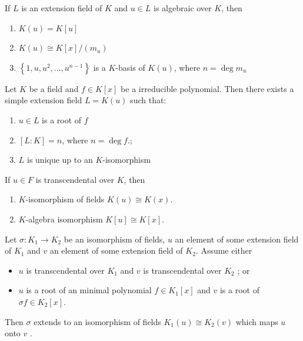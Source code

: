 \begin{theorem}
    \label{thm: Structure of simple extension}
    If $L$ is an extension field of $K$ and $ u  \in {L}$ is algebraic over $K$, then
    \begin{enumerate}
        \item
              $K(u)= K [u]$

        \item
              $K(u) \cong K [x]/( m_u )$
        \item
              $\left\{1,u ,u^2, \ldots,u^{{n}-1}\right\}$ is a $K$-basis of $K(u)$, where $n = \deg m_u$
    \end{enumerate}
\end{theorem}
\begin{corollary}
    \label{cor:adjoin a root}
    Let $K$ be a field and $ f \in K[x]$ be a irreducible polynomial.
    Then there exists a simple extension field $L= K(u)$ such that:
    \begin{enumerate}
        \item
              $ u \in L$ is a root of $f$
        \item
              $[L:K] = n$, where ${n}=\deg f$.;

        \item
              $L$ is unique up to an $K$-isomorphism
    \end{enumerate}
\end{corollary}

\begin{theorem}
    If $ u  \in {F}$ is transcendental over $K$, then
    \begin{enumerate}
        \item
              $K$-isomorphism of fields $K(u) \cong  K(x)$.

        \item
              $K$-algebra isomorphism $ K \left[u\right]  \cong  K \left[x\right]$.
    \end{enumerate}
\end{theorem}


\begin{theorem}
    Let $\sigma:  K_1 \rightarrow K_2$ be an isomorphism of fields, $u$ an element of some extension field of $K_1$ and $v$ an element of some extension field of $K_2$. Assume either
    \begin{itemize}[]
        \item
              $u$ is transcendental over $K_1$ and $v$ is transcendental over $K_2$ ; or

        \item
              $u$ is a root of an minimal polynomial $ f  \in  K_1 [ x ]$ and $v$ is a root of $\sigma  f  \in K_2[ x ]$.
    \end{itemize}
    Then $\sigma$ extends to an isomorphism of fields $ K_1 ( u ) \cong K_2(v)$ which maps $u$ onto $v$ .
\end{theorem}



